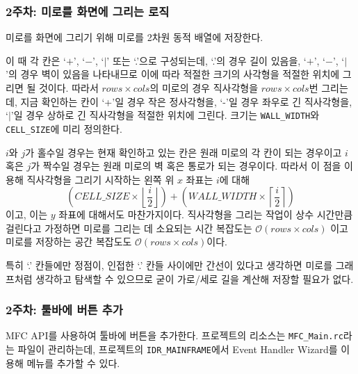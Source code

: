\subsubsection{2주차: 미로를 화면에 그리는 로직} 미로를 화면에 그리기 위해 미로를 2차원 동적 배열에 저장한다.

이 때 각 칸은 `$+$', `$-$', `$|$' 또는 `.'으로 구성되는데, `.'의 경우 길이 있음을, `$+$', `$-$', `$|$'의 경우 벽이 있음을 나타내므로
이에 따라 적절한 크기의 사각형을 적절한 위치에 그리면 될 것이다. 따라서 $rows \times cols$의 미로의 경우 직사각형을 $rows \times cols$번 그리는데,
지금 확인하는 칸이 `+'일 경우 작은 정사각형을, `-'일 경우 좌우로 긴 직사각형을, `$|$'일 경우 상하로
긴 직사각형을 적절한 위치에 그린다. 크기는 \texttt{WALL_WIDTH}와 \texttt{CELL_SIZE}에 미리 정의한다.

$i$와 $j$가 홀수일 경우는 현재 확인하고 있는 칸은 원래 미로의 각 칸이 되는 경우이고 $i$ 혹은 $j$가 짝수일 경우는 원래 미로의 벽 혹은 통로가 되는 경우이다.
따라서 이 점을 이용해 직사각형을 그리기 시작하는 왼쪽 위 $x$ 좌표는 $i$에 대해
\[\left(CELL\_SIZE \times \left\lfloor\frac{i}{2}\right\rfloor\right) + \left(WALL\_WIDTH \times \left\lceil\frac{i}{2}\right\rceil\right)\]
이고, 이는 $y$ 좌표에 대해서도 마찬가지이다. 직사각형을 그리는 작업이 상수 시간만큼 걸린다고 가정하면 미로를 그리는 데 소요되는 시간 복잡도는 $\mathcal{O}\left(rows \times cols\right)$
이고 미로를 저장하는 공간 복잡도도 $\mathcal{O}\left(rows \times cols\right)$이다.

특히 `.' 칸들에만 정점이, 인접한 `.' 칸들 사이에만 간선이 있다고 생각하면
미로를 그래프처럼 생각하고 탐색할 수 있으므로 굳이 가로/세로 길을 계산해 저장할 필요가 없다.

\subsubsection{2주차: 툴바에 버튼 추가} MFC API를 사용하여 툴바에 버튼을 추가한다. 프로젝트의 리소스는 \texttt{MFC_Main.rc}라는 파일이 관리하는데,
프로젝트의 \texttt{IDR\_MAINFRAME}에서 Event Handler Wizard를 이용해 메뉴를 추가할 수 있다.